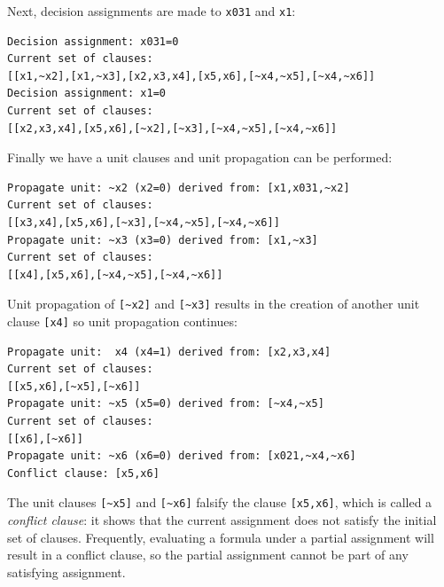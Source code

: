 \documentclass[11pt]{report}
\newcommand*{\p}[1]{\textup{\texttt{#1}}}
\begin{document}
\newpage

Next, decision assignments are made to \p{x031} and \p{x1}:
\begin{verbatim}
Decision assignment: x031=0
Current set of clauses:
[[x1,~x2],[x1,~x3],[x2,x3,x4],[x5,x6],[~x4,~x5],[~x4,~x6]]
Decision assignment: x1=0
Current set of clauses:
[[x2,x3,x4],[x5,x6],[~x2],[~x3],[~x4,~x5],[~x4,~x6]]
\end{verbatim}
Finally we have a unit clauses and unit propagation can be performed:
\begin{verbatim}
Propagate unit: ~x2 (x2=0) derived from: [x1,x031,~x2]
Current set of clauses:
[[x3,x4],[x5,x6],[~x3],[~x4,~x5],[~x4,~x6]]
Propagate unit: ~x3 (x3=0) derived from: [x1,~x3]
Current set of clauses:
[[x4],[x5,x6],[~x4,~x5],[~x4,~x6]]
\end{verbatim}
Unit propagation of \verb+[~x2]+ and \verb+[~x3]+ results in the creation of another unit clause \verb+[x4]+ so unit propagation continues:
\begin{verbatim}
Propagate unit:  x4 (x4=1) derived from: [x2,x3,x4]
Current set of clauses:
[[x5,x6],[~x5],[~x6]]
Propagate unit: ~x5 (x5=0) derived from: [~x4,~x5]
Current set of clauses:
[[x6],[~x6]]
Propagate unit: ~x6 (x6=0) derived from: [x021,~x4,~x6]
Conflict clause: [x5,x6]
\end{verbatim}
The unit clauses \verb+[~x5]+ and \verb+[~x6]+ falsify the clause \p{[x5,x6]}, which is called a \emph{conflict clause}: it shows that the current assignment does not satisfy the initial set of clauses. Frequently, evaluating a formula under a partial assignment will result in a conflict clause, so the partial assignment cannot be part of any satisfying assignment.
\end{document}
